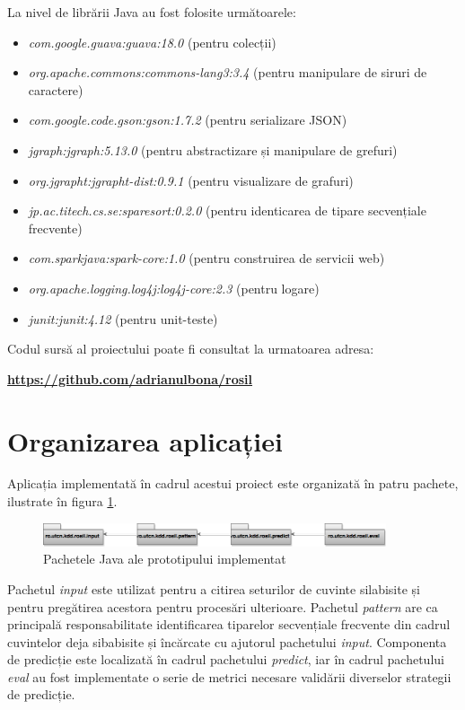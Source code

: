 La nivel de librării Java au fost folosite următoarele:

\begin{itemize}
    \item \textit{com.google.guava:guava:18.0} (pentru colecții)
	\item \textit{org.apache.commons:commons-lang3:3.4} (pentru manipulare de siruri de caractere)
    \item \textit{com.google.code.gson:gson:1.7.2} (pentru serializare JSON)
    \item \textit{jgraph:jgraph:5.13.0} (pentru abstractizare și manipulare de grefuri)
	\item \textit{org.jgrapht:jgrapht-dist:0.9.1} (pentru visualizare de 
grafuri)
	\item \textit{jp.ac.titech.cs.se:sparesort:0.2.0} (pentru identicarea de tipare secvențiale frecvente)
	\item \textit{com.sparkjava:spark-core:1.0} (pentru construirea de servicii web)
	\item \textit{org.apache.logging.log4j:log4j-core:2.3} (pentru logare)
    \item \textit{junit:junit:4.12} (pentru unit-teste)
\end{itemize}

Codul sursă al proiectului poate fi consultat la urmatoarea adresa: \begin{center}
\textbf{\href{https://github.com/adrianulbona/rosil}{https://github.com/adrianulbona/rosil}}
\end{center}

\section{Organizarea aplicației}

Aplicația implementată în cadrul acestui proiect este organizată în patru pachete, ilustrate în figura \ref{fig:rosil-packages}.

\begin{figure}[h!]
    \centering
    \includegraphics[width=0.9\textwidth]{figures/rosil-packages.png}
    \caption{Pachetele Java ale prototipului implementat}
    \label{fig:rosil-packages}
\end{figure}

Pachetul \textit{input} este utilizat pentru a citirea seturilor de cuvinte silabisite și pentru pregătirea acestora pentru procesări ulterioare. Pachetul \textit{pattern} are ca principală responsabilitate identificarea tiparelor secvențiale frecvente din cadrul cuvintelor deja sibabisite și încărcate cu ajutorul pachetului \textit{input}. Componenta de predicție este localizată în cadrul pachetului \textit{predict}, iar în cadrul pachetului \textit{eval} au fost implementate o serie de metrici necesare validării diverselor strategii de predicție.

